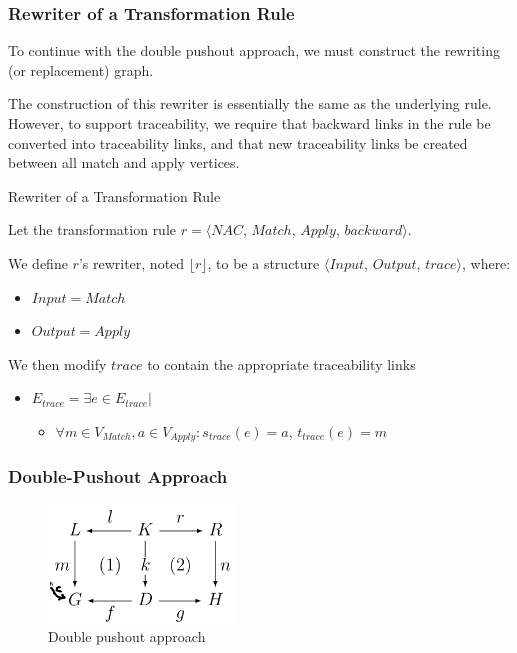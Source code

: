 \subsubsection*{Rewriter of a Transformation Rule}

To continue with the double pushout approach, we must construct the rewriting (or replacement) graph.

The construction of this rewriter is essentially the same as the underlying rule. However, to support traceability, we require that backward links in the rule be converted into traceability links, and that new traceability links be created between all match and apply vertices. 

\begin{definition}{Rewriter of a Transformation Rule\\}
\label{def:rewriter_transformation_rule}

Let the transformation rule $r = \big\langle \mathit{NAC}$, $\mathit{Match}$, $\mathit{Apply}$, $\mathit{backward}\big\rangle$.

We define $r$'s rewriter, noted $\lfloor r \rfloor$, to be a structure $\big\langle \mathit{Input}$, $\mathit{Output}$, $\mathit{trace}\big\rangle$, where:

\begin{itemize}
\item $ \mathit{Input} = \mathit{Match}$
\item $ \mathit{Output} = \mathit{Apply}$
\end{itemize}

We then modify $\mathit{trace}$ to contain the appropriate traceability links

\begin{itemize}
\item $E_{trace} = \exists e \in E_{trace} | $
\begin{itemize}
\item $ \forall m \in V_{Match}, a \in V_{Apply}:$$s_{trace}(e) = a$, $t_{trace}(e) = m$ 
\end{itemize}
\end{itemize}

\end{definition}

\subsubsection*{Double-Pushout Approach}

\begin{figure}[h!] \centering
\includegraphics[width=0.44\textwidth]{figures/formal/dpo_with_NAC}
	\caption{Double pushout approach}
	\label{fig:dpo}
\end{figure}



